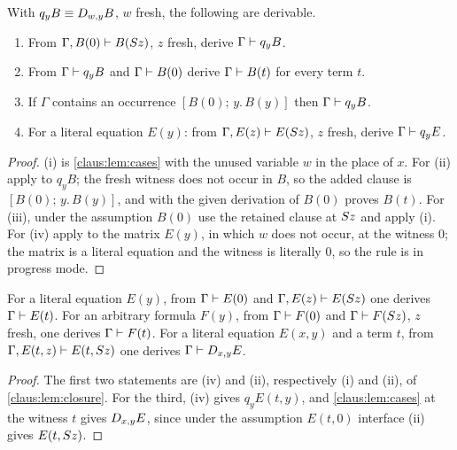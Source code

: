 \begin{lemma}
\label{claus:lem:closure}
With $q_yB\equiv D_{w,y}B$, $w$ fresh, the following are derivable.
\begin{enumerate}[label=(\roman*)]
\item From $\Gamma,B(0)\vdash B(S z)$, $z$ fresh, derive
$\Gamma\vdash q_yB$.
\item From $\Gamma\vdash q_yB$ and $\Gamma\vdash B(0)$ derive
$\Gamma\vdash B(t)$ for every term $t$.
\item If $\Gamma$ contains an occurrence $[B(0);\,y.\,B(y)]$ then
$\Gamma\vdash q_yB$.
\item For a literal equation $E(y)$: from $\Gamma,E(z)\vdash E(S z)$,
$z$ fresh, derive $\Gamma\vdash q_yE$.
\end{enumerate}
\end{lemma}
\begin{proof}
(i) is \cref{claus:lem:cases} with the unused variable $w$ in the place of
$x$. For (ii) apply  to $q_yB$; the fresh witness does not
occur in $B$, so the added clause is $[B(0);\,y.\,B(y)]$, and 
with the given derivation of $B(0)$ proves $B(t)$. For (iii), under the
assumption $B(0)$ use the retained clause at $S z$ and apply (i). For
(iv) apply  to the matrix $E(y)$, in which $w$ does not
occur, at the witness $0$; the matrix is a literal equation and the witness
is literally $0$, so the rule is in progress mode.
\end{proof}

\begin{corollary}
\label{claus:cor:induction}
For a literal equation $E(y)$, from $\Gamma\vdash E(0)$ and
$\Gamma,E(z)\vdash E(S z)$ one derives $\Gamma\vdash E(t)$. For an
arbitrary formula $F(y)$, from $\Gamma\vdash F(0)$ and
$\Gamma\vdash F(S z)$, $z$ fresh, one derives $\Gamma\vdash F(t)$. For
a literal equation $E(x,y)$ and a term $t$, from
$\Gamma,E(t,z)\vdash E(t,S z)$ one derives $\Gamma\vdash D_{x,y}E$.
\end{corollary}
\begin{proof}
The first two statements are (iv) and (ii), respectively (i) and (ii), of
\cref{claus:lem:closure}. For the third, (iv) gives $q_yE(t,y)$, and
\cref{claus:lem:cases} at the witness $t$ gives $D_{x,y}E$, since under the
assumption $E(t,0)$ interface (ii) gives $E(t,S z)$.
\end{proof}

